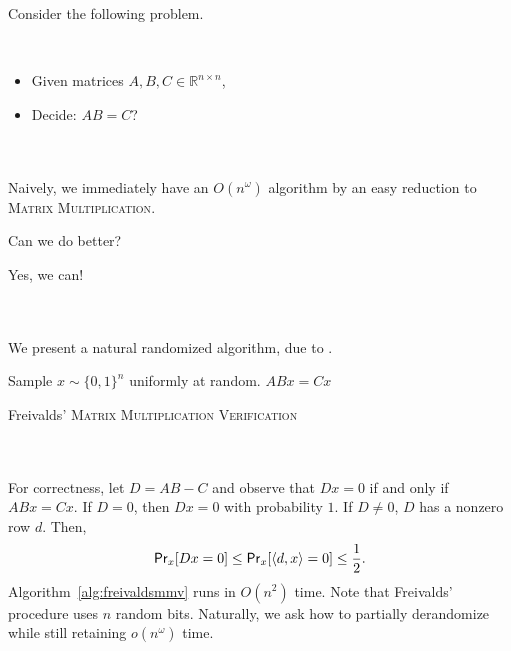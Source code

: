         Consider the following problem.
        \begin{compprob} \label{prob:matmulverify}
            \vphantom
            \\
            \begin{itemize}
                \item Given matrices \(A,B,C\in\mathbb{R}^{n\times n}\),
                \item Decide: \(AB=C\)?
            \end{itemize}
        \end{compprob}
        \vphantom
        \\
        \\
        Naively, we immediately have an \(O(n^\omega)\) algorithm by an easy reduction to \textsc{Matrix Multiplication}.
        \begin{question*}
            Can we do better?
        \end{question*}
        \begin{answer*}
            Yes, we can!
        \end{answer*}
        \vphantom
        \\
        \\
        We present a natural randomized algorithm, due to \cite{freivalds1979mfcs}.
        \begin{algorithm}[H] 
            \begin{algorithmic}[1]
                    \State Sample \(x\sim\{0,1\}^n\) uniformly at random.
                    \State \Return \(ABx=Cx\) 
                \EndProcedure 
            \end{algorithmic}
            \caption{Freivalds' \textsc{Matrix Multiplication Verification}}
            \label{alg:freivaldsmmv}
        \end{algorithm}
        \vphantom
        \\
        \\
        For correctness, let \(D=AB-C\) and observe that \(Dx=0\) if and only if \(ABx=Cx\). If \(D=0\), then \(Dx=0\) with probability \(1\). If \(D\neq0\), \(D\) has a nonzero row \(d\). Then,
        \begin{align*}
            \mathsf{Pr}_x[Dx=0]\leq \mathsf{Pr}_x[\left\langle d,x\right\rangle=0]\leq\frac{1}{2}.
        \end{align*}
        Algorithm~\ref{alg:freivaldsmmv} runs in \(O(n^2)\) time. Note that Freivalds' procedure uses \(n\) random bits. Naturally, we ask how to partially derandomize while still retaining \(o\left(n^\omega\right)\) time. 

